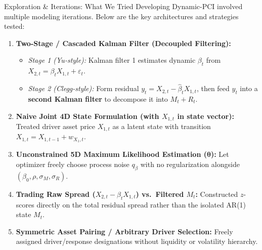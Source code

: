 \documentclass[10pt, aspectratio=169]{beamer}
\begin{document}
\begin{frame}{Exploration \& Iterations: What We Tried}
  Developing Dynamic-PCI involved multiple modeling iterations. Below are the key architectures and strategies tested:
  \vspace{4pt}
  \begin{enumerate}
    \item \textbf{Two-Stage / Cascaded Kalman Filter (Decoupled Filtering):}
          \begin{itemize}
            \item \emph{Stage 1 (Yu-style):} Kalman filter 1 estimates dynamic $\beta_t$ from $X_{2,t} = \beta_t X_{1,t} + \varepsilon_t$.
            \item \emph{Stage 2 (Clegg-style):} Form residual $y_t = X_{2,t} - \hat{\beta}_t X_{1,t}$, then feed $y_t$ into a \textbf{second Kalman filter} to decompose it into $M_t + R_t$.
          \end{itemize}
    \item \textbf{Naive Joint 4D State Formulation (with $X_{1,t}$ in state vector):}
          Treated driver asset price $X_{1,t}$ as a latent state with transition $X_{1,t} = X_{1,t-1} + w_{X_1,t}$.
    \item \textbf{Unconstrained 5D Maximum Likelihood Estimation ($\bm{\theta}$):}
          Let optimizer freely choose process noise $q_\beta$ with no regularization alongside $(\beta_0, \rho, \sigma_M, \sigma_R)$.
    \item \textbf{Trading Raw Spread ($X_{2,t} - \beta_t X_{1,t}$) vs.\ Filtered $M_t$:}
          Constructed $z$-scores directly on the total residual spread rather than the isolated AR(1) state $M_t$.
    \item \textbf{Symmetric Asset Pairing / Arbitrary Driver Selection:}
          Freely assigned driver/response designations without liquidity or volatility hierarchy.
  \end{enumerate}
\end{frame}
\end{document}
